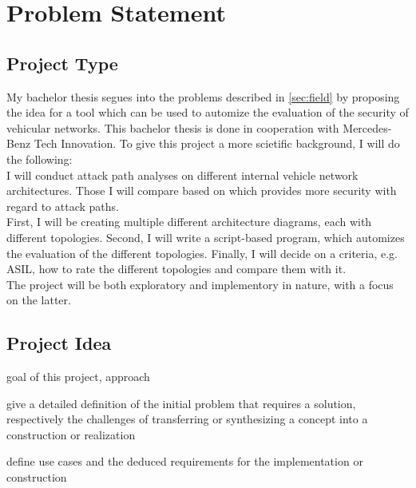 
\chapter{Problem Statement}
\label{sec:problem}

\section{Project Type}\label{sec:type}

My bachelor thesis segues into the problems described in \ref{sec:field} by proposing the idea for a tool which can be used to automize the evaluation of the security of vehicular networks.
This bachelor thesis is done in cooperation with Mercedes-Benz Tech Innovation.
To give this project a more scietific background, I will do the following: \\

I will conduct attack path analyses on different internal vehicle network architectures.
Those I will compare based on which provides more security with regard to attack paths.\\

First, I will be creating multiple different architecture diagrams, each with different topologies.
Second, I will write a script-based program, which automizes the evaluation of the different topologies.
Finally, I will decide on a criteria, e.g. ASIL, how to rate the different topologies and compare them with it.\\

The project will be both exploratory and implementory in nature, with a focus on the latter.


\section{Project Idea}
\label{chp:requirements}


\begin{shaded}
\noindent
goal of this project, approach

\medskip
\noindent
give a detailed definition of the initial problem that requires a solution, 
respectively the challenges of transferring or synthesizing a concept into a construction or realization

\medskip
\noindent
define use cases and the deduced requirements for the implementation or construction
\end{shaded}


